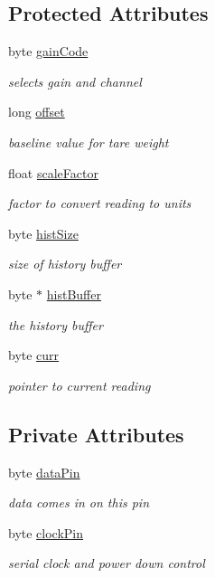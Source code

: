 \subsection*{Protected Attributes}
\begin{DoxyCompactItemize}
\item 
byte \hyperlink{class_n_b_h_x711_a39f8eb80ac3420751d5ffc1d9f3df921}{gain\+Code}
\begin{DoxyCompactList}\small\item\em selects gain and channel \end{DoxyCompactList}\item 
long \hyperlink{class_n_b_h_x711_a2deeadef7a2a07b0f5d799d2b0be13c2}{offset}
\begin{DoxyCompactList}\small\item\em baseline value for tare weight \end{DoxyCompactList}\item 
float \hyperlink{class_n_b_h_x711_a66c39708e8529ec8a510cea042d81dd1}{scale\+Factor}
\begin{DoxyCompactList}\small\item\em factor to convert reading to units \end{DoxyCompactList}\item 
byte \hyperlink{class_n_b_h_x711_a9778cd777788b90d4aa8efb78cf4afc8}{hist\+Size}
\begin{DoxyCompactList}\small\item\em size of history buffer \end{DoxyCompactList}\item 
byte $\ast$ \hyperlink{class_n_b_h_x711_a25db401ce2ec1944b1a1b6178ac9b537}{hist\+Buffer}
\begin{DoxyCompactList}\small\item\em the history buffer \end{DoxyCompactList}\item 
byte \hyperlink{class_n_b_h_x711_a6b89562f95840002b94a0ae8f8fb6530}{curr}
\begin{DoxyCompactList}\small\item\em pointer to current reading \end{DoxyCompactList}\end{DoxyCompactItemize}
\subsection*{Private Attributes}
\begin{DoxyCompactItemize}
\item 
byte \hyperlink{class_n_b_h_x711_a3e4bfa7378e1203fb172b1d53da31073}{data\+Pin}
\begin{DoxyCompactList}\small\item\em data comes in on this pin \end{DoxyCompactList}\item 
byte \hyperlink{class_n_b_h_x711_a1edd07d22e36984a252b4555a9d3ce0b}{clock\+Pin}
\begin{DoxyCompactList}\small\item\em serial clock and power down control \end{DoxyCompactList}\end{DoxyCompactItemize}


